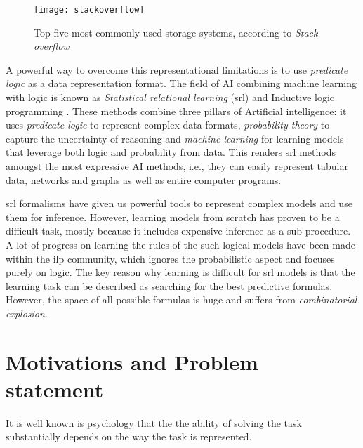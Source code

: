 \begin{figure}
	\medskip
	\centering 
	\texttt{[image: stackoverflow]}
	\caption{Top five most commonly used storage systems, according to \textit{Stack overflow}\label{fig:stackoverflow}}
\end{figure}


A powerful way to overcome this representational limitations is to use \textit{predicate logic} as a data representation format. 
The field of AI combining machine learning with logic is known as \textit{Statistical relational learning} (\gls{srl}) \cite{GetoorSRL,Raedt:2016:SRA:3027718} and Inductive logic programming \cite{LucRLbook}.
These methods combine three pillars of Artificial intelligence: it uses \textit{predicate logic} to represent complex data formats, \textit{probability theory} to capture the uncertainty of reasoning and \textit{machine learning} for learning models that leverage both logic and probability from data.
This renders \gls{srl} methods amongst the most expressive AI methods, i.e., they can easily represent tabular data, networks and graphs as well as entire computer programs. 



\gls{srl} formalisms have given us powerful tools to represent complex models and use them for inference.
However, learning models from scratch has proven to be a difficult task, mostly because it includes expensive inference as a sub-procedure.
A lot of progress on learning the rules of the such logical models have been made within the \gls{ilp} community, which ignores the probabilistic aspect and focuses purely on logic.
The key reason why learning is difficult for \gls{srl} models is that the learning task can be described as searching for the best predictive formulas.
However, the space of all possible formulas is huge and suffers from \textit{combinatorial explosion}.










\section{Motivations and Problem statement}

It is well known is psychology that the the ability of solving the task substantially depends on the way the task is represented.

 
